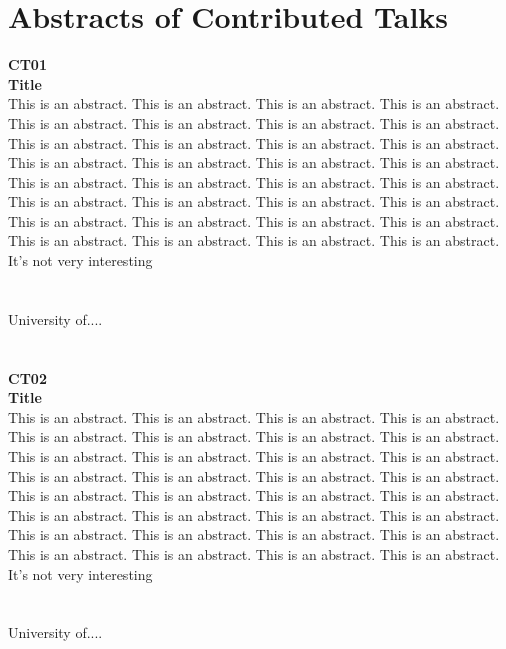 \chapter*{Abstracts of  Contributed Talks}

\begin{multicols}{2}
\noindent\textbf{CT01}\\
\textbf{Title}\\
This is an abstract. This is an abstract. This is an abstract. This is an abstract. This is an abstract. This is an abstract. This is an abstract. This is an abstract. This is an abstract. This is an abstract. This is an abstract. This is an abstract. This is an abstract. This is an abstract. This is an abstract. This is an abstract. This is an abstract. This is an abstract. This is an abstract. This is an abstract. This is an abstract. This is an abstract. This is an abstract. This is an abstract. This is an abstract. This is an abstract. This is an abstract. This is an abstract. This is an abstract. This is an abstract. This is an abstract. This is an abstract. \\It's not very interesting\\\\
\\
University of....\\
\\\\

\noindent\textbf{CT02}\\
\textbf{Title}\\
This is an abstract. This is an abstract. This is an abstract. This is an abstract. This is an abstract. This is an abstract. This is an abstract. This is an abstract. This is an abstract. This is an abstract. This is an abstract. This is an abstract. This is an abstract. This is an abstract. This is an abstract. This is an abstract. This is an abstract. This is an abstract. This is an abstract. This is an abstract. This is an abstract. This is an abstract. This is an abstract. This is an abstract. This is an abstract. This is an abstract. This is an abstract. This is an abstract. This is an abstract. This is an abstract. This is an abstract. This is an abstract. \\It's not very interesting\\\\
\\
University of....\\
\\\\


\end{multicols}
